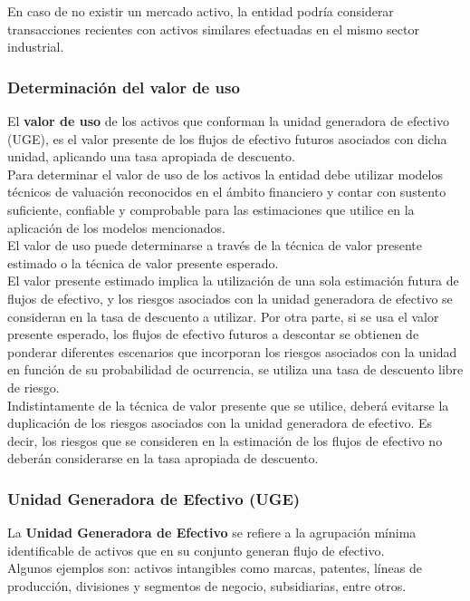En caso de no existir un mercado activo, la entidad podría considerar transacciones recientes con activos similares efectuadas en el mismo sector industrial.\\

\subsubsection{Determinación del valor de uso}

El \textcolor{principal}{\textbf{valor de uso}} de los activos que conforman la unidad generadora de efectivo (UGE), es el valor presente de los flujos de efectivo futuros asociados con dicha unidad, aplicando una tasa apropiada de descuento.\\

Para determinar el valor de uso de los activos la entidad debe utilizar modelos técnicos de valuación reconocidos en el ámbito financiero y contar con sustento suficiente, confiable y comprobable para las estimaciones que utilice en la aplicación de los modelos mencionados.\\

El valor de uso puede determinarse a través de la técnica de valor presente estimado o la técnica de valor presente esperado.\\

El valor presente estimado implica la utilización de una sola estimación futura de flujos de efectivo, y los riesgos asociados con la unidad generadora de efectivo se consideran en la tasa de descuento a utilizar. Por otra parte, si se usa el valor presente esperado, los flujos de efectivo futuros a descontar se obtienen de ponderar diferentes escenarios que incorporan los riesgos asociados con la unidad en función de su probabilidad de ocurrencia, se utiliza una tasa de descuento libre de riesgo.\\

Indistintamente de la técnica de valor presente que se utilice, deberá evitarse la duplicación de los riesgos asociados con la unidad generadora de efectivo. Es decir, los riesgos que se consideren en la estimación de los flujos de efectivo no deberán considerarse en la tasa apropiada de descuento.\\

\subsubsection{Unidad Generadora de Efectivo (UGE)}

La \textcolor{principal}{\textbf{Unidad Generadora de Efectivo}} se refiere a la agrupación mínima identificable de activos que en su conjunto generan flujo de efectivo.\\

Algunos ejemplos son: activos intangibles como marcas, patentes, líneas de producción, divisiones y segmentos de negocio, subsidiarias, entre otros.\\
